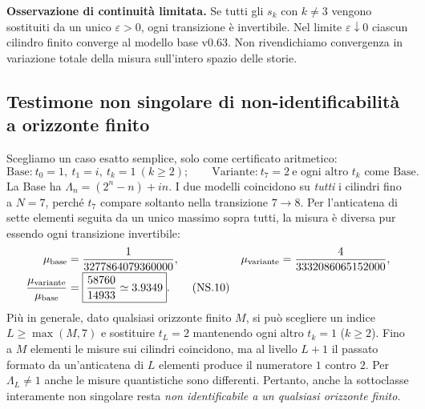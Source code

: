 \documentclass[11pt,a4paper]{article}
\begin{document}
\textbf{Osservazione di continuit\`a limitata.} Se tutti gli $s_k$ con $k\neq3$ vengono sostituiti da un unico $\varepsilon>0$, ogni transizione \`e invertibile. Nel limite $\varepsilon\downarrow0$ ciascun cilindro finito converge al modello base v0.63. Non rivendichiamo convergenza in variazione totale della misura sull'intero spazio delle storie.

\clearpage
\subsection*{Testimone non singolare di non-identificabilit\`a a orizzonte finito}
Scegliamo un caso esatto semplice, solo come certificato aritmetico:
\begin{equation}
\boxed{\text{Base:}\ t_0=1,\ t_1=i,\ t_k=1\ (k\ge2);
\qquad\text{Variante:}\ t_7=2\ \text{e ogni altro }t_k\text{ come Base}.}\tag{NS.9}
\end{equation}
La Base ha $\Lambda_n=(2^n-n)+in$. I due modelli coincidono su \emph{tutti} i cilindri fino a $N=7$, perch\'e $t_7$ compare soltanto nella transizione $7\to8$. Per l'anticatena di sette elementi seguita da un unico massimo sopra tutti, la misura \`e diversa pur essendo ogni transizione invertibile:
\begin{align}
\mu_{\mathrm{base}}&=\frac1{3277864079360000},
&\mu_{\mathrm{variante}}&=\frac4{3332086065152000},\notag\\[-2pt]
\frac{\mu_{\mathrm{variante}}}{\mu_{\mathrm{base}}}&=\boxed{\frac{58760}{14933}\simeq3.9349}.\tag{NS.10}
\end{align}
Pi\`u in generale, dato qualsiasi orizzonte finito $M$, si pu\`o scegliere un indice $L\ge\max(M,7)$ e sostituire $t_L=2$ mantenendo ogni altro $t_k=1$ ($k\ge2$). Fino a $M$ elementi le misure sui cilindri coincidono, ma al livello $L+1$ il passato formato da un'anticatena di $L$ elementi produce il numeratore $1$ contro $2$. Per $\Lambda_L\neq1$ anche le misure quantistiche sono differenti. Pertanto, anche la sottoclasse interamente non singolare resta \emph{non identificabile a un qualsiasi orizzonte finito}.
\end{document}
